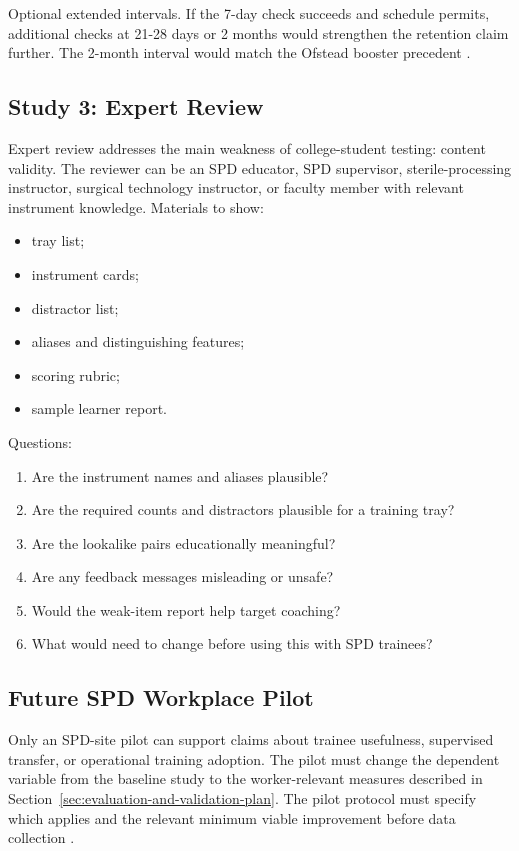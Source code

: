 \documentclass[10pt,a4paper]{article}
\begin{document}
Optional extended intervals. If the 7-day check succeeds and schedule permits,
additional checks at 21-28 days or 2 months would strengthen the retention claim
further. The 2-month interval would match the Ofstead booster precedent
\cite{ofstead-et-al-2023}.
\subsection{Study 3: Expert Review}


Expert review addresses the main weakness of college-student testing: content
validity. The reviewer can be an SPD educator, SPD supervisor,
sterile-processing instructor, surgical technology instructor, or faculty
member with relevant instrument knowledge.
Materials to show:
\begin{itemize}
  \item tray list;
  \item instrument cards;
  \item distractor list;
  \item aliases and distinguishing features;
  \item scoring rubric;
  \item sample learner report.
\end{itemize}
Questions:
\begin{enumerate}
  \item Are the instrument names and aliases plausible?
  \item Are the required counts and distractors plausible for a training tray?
  \item Are the lookalike pairs educationally meaningful?
  \item Are any feedback messages misleading or unsafe?
  \item Would the weak-item report help target coaching?
  \item What would need to change before using this with SPD trainees?
\end{enumerate}
\subsection{Future SPD Workplace Pilot}

Only an SPD-site pilot can support claims about trainee usefulness, supervised
transfer, or operational training adoption. The pilot must change the dependent
variable from the baseline study to the worker-relevant measures described in
Section~\ref{sec:evaluation-and-validation-plan}. The pilot protocol must
specify which applies and the relevant minimum viable improvement before data
collection \cite{kirkpatrick-evaluation-1994, arthur-et-al-2003}.
\end{document}

